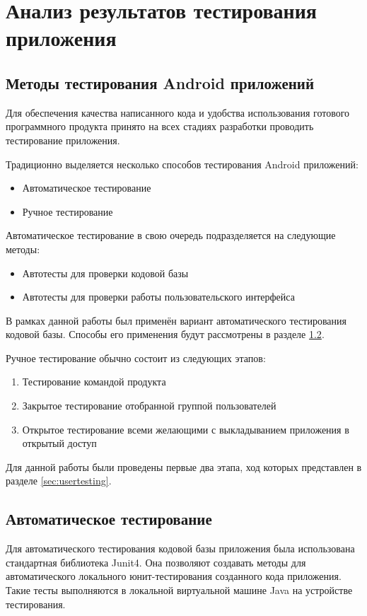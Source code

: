 \chapter{Анализ результатов тестирования приложения}
\section{Методы тестирования Android приложений}
Для обеспечения качества написанного кода и удобства использования готового программного продукта принято на всех стадиях разработки проводить тестирование приложения. 

Традиционно выделяется несколько способов тестирования Android приложений:
\begin{itemize}
	\item Автоматическое тестирование
	\item Ручное тестирование
\end{itemize}

Автоматическое тестирование в свою очередь подразделяется на следующие методы:
\begin{itemize}
	\item Автотесты для проверки кодовой базы
	\item Автотесты для проверки работы пользовательского интерфейса
\end{itemize}
В рамках данной работы был применён вариант автоматического тестирования кодовой базы. Способы его применения будут рассмотрены в разделе \ref{sec:autotesting}.

Ручное тестирование обычно состоит из следующих этапов:
\begin{enumerate}
	\item Тестирование командой продукта
	\item Закрытое тестирование отобранной группой пользователей
	\item Открытое тестирование всеми желающими с выкладыванием приложения в открытый доступ
\end{enumerate}
Для данной работы были проведены первые два этапа, ход которых представлен в разделе \ref{sec:usertesting}.

\section{Автоматическое тестирование}
\label{sec:autotesting}
Для автоматического тестирования кодовой базы приложения была использована стандартная библиотека Junit4. Она позволяют создавать методы для автоматического локального юнит-тестирования созданного кода приложения. Такие тесты выполняются в локальной виртуальной машине Java на устройстве тестирования.

